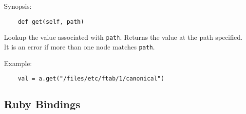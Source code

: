 Synopsis:

\begin{verbatim}
    def get(self, path)
\end{verbatim}

Lookup the value associated with \verb!path!. Returns the value at the path specified. It is an error if more than one node matches \verb!path!.

Example:

\begin{verbatim}
    val = a.get("/files/etc/ftab/1/canonical")
\end{verbatim}

\subsection{Ruby Bindings}





